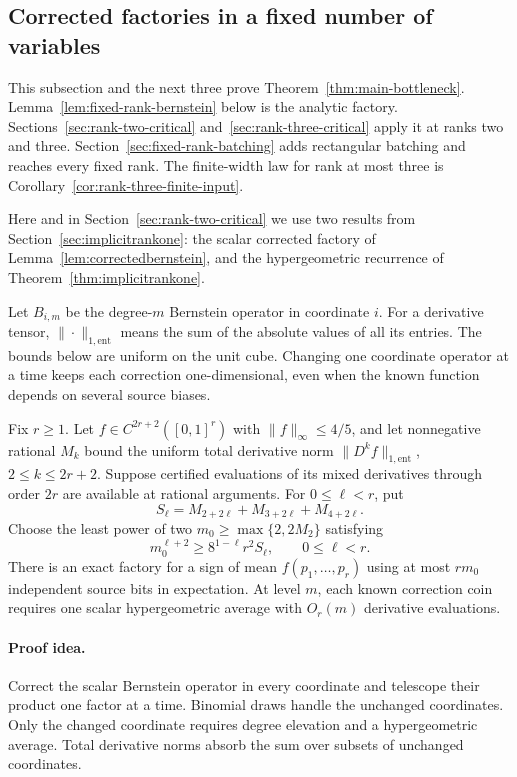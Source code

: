 \subsection{Corrected factories in a fixed number of variables}
\label{sec:fixed-rank-bernstein}

This subsection and the next three prove
Theorem~\ref{thm:main-bottleneck}. Lemma~\ref{lem:fixed-rank-bernstein}
below is the analytic factory. Sections~\ref{sec:rank-two-critical}
and~\ref{sec:rank-three-critical} apply it at ranks two and three.
Section~\ref{sec:fixed-rank-batching} adds rectangular batching and
reaches every fixed rank. The finite-width law for rank at most three
is Corollary~\ref{cor:rank-three-finite-input}.

Here and in Section~\ref{sec:rank-two-critical} we use two results
from Section~\ref{sec:implicitrankone}: the scalar corrected factory of
Lemma~\ref{lem:correctedbernstein}, and the hypergeometric recurrence
of Theorem~\ref{thm:implicitrankone}.

Let $B_{i,m}$ be the degree-$m$ Bernstein operator in coordinate
$i$. For a derivative tensor, $\|\cdot\|_{1,\mathrm{ent}}$ means
the sum of the absolute values of all its entries. The bounds below
are uniform on the unit cube. Changing one coordinate operator at
a time keeps each correction one-dimensional, even when the known
function depends on several source biases.

\begin{lemma}
\label{lem:fixed-rank-bernstein}
Fix $r\ge1$. Let $f\in C^{2r+2}([0,1]^r)$ with
$\|f\|_\infty\le4/5$, and let nonnegative rational $M_k$ bound
the uniform total derivative norm $\|D^kf\|_{1,\mathrm{ent}}$,
$2\le k\le2r+2$. Suppose certified evaluations of its mixed
derivatives through order $2r$ are available at rational arguments.
For $0\le\ell<r$, put
\[
 S_\ell=M_{2+2\ell}+M_{3+2\ell}+M_{4+2\ell}.
\]
Choose the least power of two $m_0\ge\max\{2,2M_2\}$ satisfying
\[
 m_0^{\ell+2}\ge8^{1-\ell}r^2S_\ell,
 \qquad0\le\ell<r.
\]
There is an exact factory for a sign of mean $f(p_1,\ldots,p_r)$
using at most $rm_0$ independent source bits in expectation.
At level $m$, each known correction coin requires one scalar
hypergeometric average with $O_r(m)$ derivative evaluations.
\end{lemma}

\paragraph{Proof idea.}
Correct the scalar Bernstein operator in every coordinate and telescope
their product one factor at a time. Binomial draws handle the unchanged
coordinates. Only the changed coordinate requires degree elevation and a
hypergeometric average. Total derivative norms absorb the sum over subsets
of unchanged coordinates.

